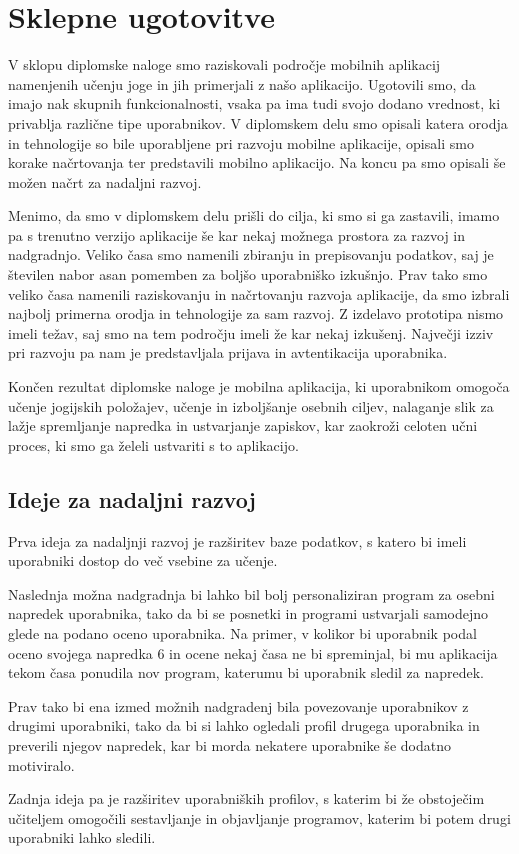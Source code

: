 \documentclass[a4paper, 12pt]{book}
\begin{document}
\chapter{Sklepne ugotovitve}
\label{stroka}

V sklopu diplomske naloge smo raziskovali področje mobilnih aplikacij namenjenih učenju joge in jih primerjali z našo aplikacijo. Ugotovili smo, da imajo nak skupnih funkcionalnosti, vsaka pa ima tudi svojo dodano vrednost, ki privablja različne tipe uporabnikov. V diplomskem delu smo opisali katera orodja in tehnologije so bile uporabljene pri razvoju mobilne aplikacije, opisali smo korake načrtovanja ter predstavili mobilno aplikacijo. Na koncu pa smo opisali še možen načrt za nadaljni razvoj. 

Menimo, da smo v diplomskem delu prišli do cilja, ki smo si ga zastavili, imamo pa s trenutno verzijo aplikacije še kar nekaj možnega prostora za razvoj in nadgradnjo. Veliko časa smo namenili zbiranju in prepisovanju podatkov, saj je številen nabor asan pomemben za boljšo uporabniško izkušnjo. Prav tako smo veliko časa namenili raziskovanju in načrtovanju razvoja aplikacije, da smo izbrali najbolj primerna orodja in tehnologije za sam razvoj. Z izdelavo prototipa nismo imeli težav, saj smo na tem področju imeli že kar nekaj izkušenj. Največji izziv pri razvoju pa nam je predstavljala prijava in avtentikacija uporabnika. 

Končen rezultat diplomske naloge je mobilna aplikacija, ki uporabnikom omogoča učenje jogijskih položajev, učenje in izboljšanje osebnih ciljev, nalaganje slik za lažje spremljanje napredka in ustvarjanje zapiskov, kar zaokroži celoten učni proces, ki smo ga želeli ustvariti s to aplikacijo.


\section{Ideje za nadaljni razvoj}
Prva ideja za nadaljnji razvoj je razširitev baze podatkov, s katero bi imeli uporabniki dostop do več vsebine za učenje.

Naslednja možna nadgradnja bi lahko bil bolj personaliziran program za osebni napredek uporabnika, tako da bi se posnetki in programi ustvarjali samodejno glede na podano oceno uporabnika. Na primer, v kolikor bi uporabnik podal oceno svojega napredka 6 in ocene nekaj časa ne bi spreminjal, bi mu aplikacija tekom časa ponudila nov program, katerumu bi uporabnik sledil za napredek. 

Prav tako bi ena izmed možnih nadgradenj bila povezovanje uporabnikov z drugimi uporabniki, tako da bi si lahko ogledali profil drugega uporabnika in preverili njegov napredek, kar bi morda nekatere uporabnike še dodatno motiviralo. 

Zadnja ideja pa je razširitev uporabniških profilov, s katerim bi že obstoječim učiteljem omogočili sestavljanje in objavljanje programov, katerim bi potem drugi uporabniki lahko sledili.


\clearpage
{}


\end{document}
